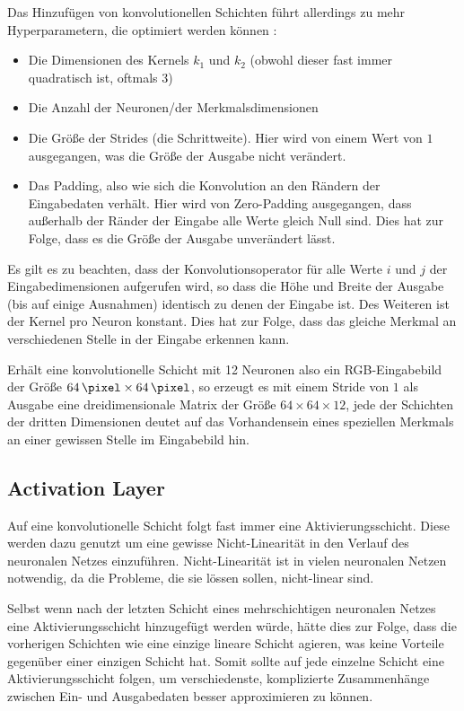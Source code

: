 Das Hinzufügen von konvolutionellen Schichten führt allerdings zu mehr Hyperparametern, die optimiert werden können \cite{cs231n}:
\begin{itemize}
	\item Die Dimensionen des Kernels $k_1$ und $k_2$ (obwohl dieser fast immer quadratisch ist, oftmals $3$)
	\item Die Anzahl der Neuronen/der Merkmalsdimensionen
	\item Die Größe der Strides (die Schrittweite). Hier wird von einem Wert von $1$ ausgegangen, was die Größe der Ausgabe nicht verändert.
	\item Das Padding, also wie sich die Konvolution an den Rändern der Eingabedaten verhält. Hier wird von Zero-Padding ausgegangen, \dahe dass außerhalb der Ränder der Eingabe alle Werte gleich Null sind. Dies hat zur Folge, dass es die Größe der Ausgabe unverändert lässt.
\end{itemize}

Es gilt es zu beachten, dass der Konvolutionsoperator für alle Werte $i$ und $j$ der Eingabedimensionen aufgerufen wird, so dass die Höhe und Breite der Ausgabe (bis auf einige Ausnahmen) identisch zu denen der Eingabe ist.
Des Weiteren ist der Kernel pro Neuron konstant. Dies hat \ua zur Folge, dass das gleiche Merkmal an verschiedenen Stelle in der Eingabe erkennen kann.

Erhält eine konvolutionelle Schicht mit 12 Neuronen also \bspw ein RGB-Eingabebild der Größe $\SI{64}{\pixel}\times\SI{64}{\pixel}$, so erzeugt es mit einem Stride von $1$ als Ausgabe eine dreidimensionale Matrix der Größe $64\times64\times12$, jede der Schichten der dritten Dimensionen deutet auf das Vorhandensein eines speziellen Merkmals an einer gewissen Stelle im Eingabebild hin.

\subsection{Activation Layer}
\label{ssec:activation}

Auf eine konvolutionelle Schicht folgt fast immer eine Aktivierungsschicht. Diese werden dazu genutzt um eine gewisse Nicht-Linearität in den Verlauf des neuronalen Netzes einzuführen. Nicht-Linearität ist in vielen neuronalen Netzen notwendig, da die Probleme, die sie lössen sollen, nicht-linear sind. \cite[Kap.~6]{deeplearning_16}

Selbst wenn nach der letzten Schicht eines mehrschichtigen neuronalen Netzes eine Aktivierungsschicht hinzugefügt werden würde, hätte dies zur Folge, dass die vorherigen Schichten wie eine einzige lineare Schicht agieren, was keine Vorteile gegenüber einer einzigen Schicht hat. Somit sollte auf jede einzelne Schicht eine Aktivierungsschicht folgen, um verschiedenste, komplizierte Zusammenhänge zwischen Ein- und Ausgabedaten besser approximieren zu können. \cite[Kap.~3]{deeplearning_18}

